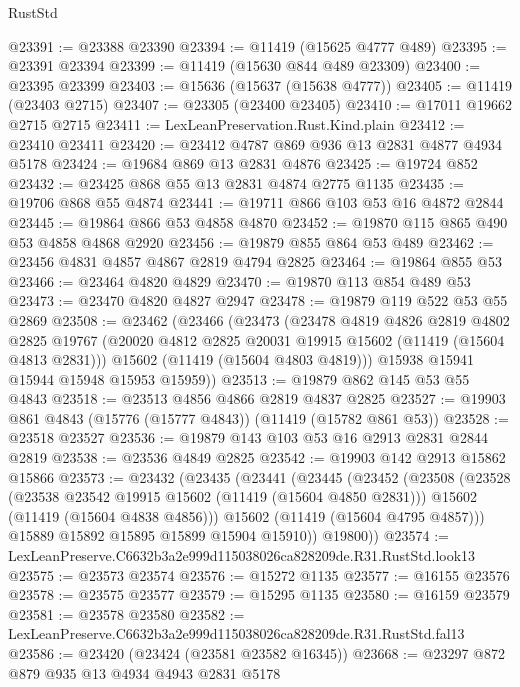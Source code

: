 \begin{lexlean}{RustStd}
\begin{coremodule}
@23391 := @23388 @23390
@23394 := @11419 (@15625 @4777 @489)
@23395 := @23391 @23394
@23399 := @11419 (@15630 @844 @489 @23309)
@23400 := @23395 @23399
@23403 := @15636 (@15637 (@15638 @4777))
@23405 := @11419 (@23403 @2715)
@23407 := @23305 (@23400 @23405)
@23410 := @17011 @19662 @2715 @2715
@23411 := LexLeanPreservation.Rust.Kind.plain
@23412 := @23410 @23411
@23420 := @23412 @4787 @869 @936 @13 @2831 @4877 @4934 @5178
@23424 := @19684 @869 @13 @2831 @4876
@23425 := @19724 @852
@23432 := @23425 @868 @55 @13 @2831 @4874 @2775 @1135
@23435 := @19706 @868 @55 @4874
@23441 := @19711 @866 @103 @53 @16 @4872 @2844
@23445 := @19864 @866 @53 @4858 @4870
@23452 := @19870 @115 @865 @490 @53 @4858 @4868 @2920
@23456 := @19879 @855 @864 @53 @489
@23462 := @23456 @4831 @4857 @4867 @2819 @4794 @2825
@23464 := @19864 @855 @53
@23466 := @23464 @4820 @4829
@23470 := @19870 @113 @854 @489 @53
@23473 := @23470 @4820 @4827 @2947
@23478 := @19879 @119 @522 @53 @55 @2869
@23508 := @23462
    (@23466
      (@23473
        (@23478
          @4819
          @4826
          @2819
          @4802
          @2825
          @19767
          (@20020 @4812 @2825 @20031 @19915 @15602 (@11419 (@15604 @4813 @2831)))
          @15602
          (@11419 (@15604 @4803 @4819)))
        @15938
        @15941
        @15944
        @15948
        @15953
        @15959))
@23513 := @19879 @862 @145 @53 @55 @4843
@23518 := @23513 @4856 @4866 @2819 @4837 @2825
@23527 := @19903 @861 @4843 (@15776 (@15777 @4843)) (@11419 (@15782 @861 @53))
@23528 := @23518 @23527
@23536 := @19879 @143 @103 @53 @16 @2913 @2831 @2844 @2819
@23538 := @23536 @4849 @2825
@23542 := @19903 @142 @2913 @15862 @15866
@23573 := @23432
    (@23435
      (@23441
        (@23445
          (@23452
            (@23508
              (@23528
                (@23538 @23542 @19915 @15602 (@11419 (@15604 @4850 @2831)))
                @15602
                (@11419 (@15604 @4838 @4856)))
              @15602
              (@11419 (@15604 @4795 @4857)))
            @15889
            @15892
            @15895
            @15899
            @15904
            @15910))
        @19800))
@23574 := LexLeanPreserve.C6632b3a2e999d115038026ca828209de.R31.RustStd.look13
@23575 := @23573 @23574
@23576 := @15272 @1135
@23577 := @16155 @23576
@23578 := @23575 @23577
@23579 := @15295 @1135
@23580 := @16159 @23579
@23581 := @23578 @23580
@23582 := LexLeanPreserve.C6632b3a2e999d115038026ca828209de.R31.RustStd.fal13
@23586 := @23420 (@23424 (@23581 @23582 @16345))
@23668 := @23297
    @872
    @879
    @935
    @13
    @4934
    @4943
    @2831
    @5178

\end{coremodule}
\end{lexlean}
